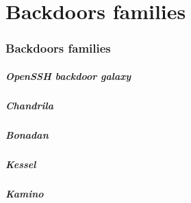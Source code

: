 \part{Backdoors families}
\section{Backdoors families}

\begin{frame}
	\partpage
\end{frame}

\begin{frame}
	\frametitle{OpenSSH backdoor galaxy}
\end{frame}

\begin{frame}
	\frametitle{Chandrila}
\end{frame}

\begin{frame}
	\frametitle{Bonadan}
\end{frame}

\begin{frame}
	\frametitle{Kessel}
\end{frame}

\begin{frame}
	\frametitle{Kamino}
\end{frame}

